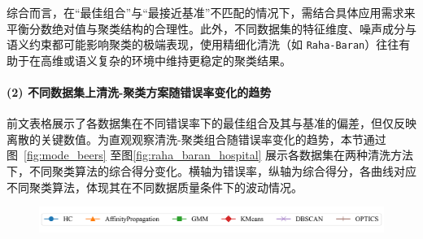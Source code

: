 \documentclass[10pt]{article} %
\numberwithin{equation}{section}
\begin{document}
综合而言，在“最佳组合”与“最接近基准”不匹配的情况下，需结合具体应用需求来平衡分数绝对值与聚类结构的合理性。此外，不同数据集的特征维度、噪声成分与语义约束都可能影响聚类的极端表现，使用精细化清洗（如 \texttt{Raha-Baran}）往往有助于在高维或语义复杂的环境中维持更稳定的聚类结果。

\paragraph{(2) 不同数据集上清洗-聚类方案随错误率变化的趋势}
前文表格展示了各数据集在不同错误率下的最佳组合及其与基准的偏差，但仅反映离散的关键数值。为直观观察清洗-聚类组合随错误率变化的趋势，本节通过图~\ref{fig:mode_beers} 至图\ref{fig:raha_baran_hospital} 展示各数据集在两种清洗方法下，不同聚类算法的综合得分变化。横轴为错误率，纵轴为综合得分，各曲线对应不同聚类算法，体现其在不同数据质量条件下的波动情况。
\begin{figure}[htbp]
    \centering
    \includegraphics[width=0.6\linewidth]{legend.png} %
\end{figure}
\end{document}
